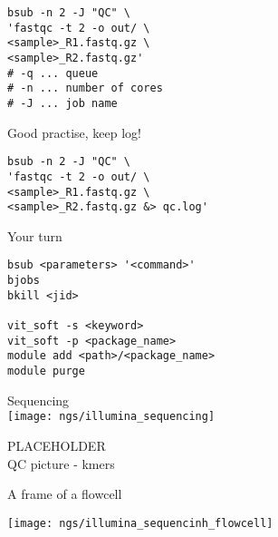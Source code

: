 \documentclass[xcolor=dvipsnames]{beamer}
\begin{document}
\begin{frame}[fragile]
\LARGE
\begin{verbatim}
bsub -n 2 -J "QC" \
'fastqc -t 2 -o out/ \
<sample>_R1.fastq.gz \
<sample>_R2.fastq.gz'
# -q ... queue
# -n ... number of cores
# -J ... job name
\end{verbatim}
\end{frame}

\begin{frame}[fragile]
Good practise, keep log!
\LARGE
\begin{verbatim}
bsub -n 2 -J "QC" \
'fastqc -t 2 -o out/ \
<sample>_R1.fastq.gz \
<sample>_R2.fastq.gz &> qc.log'
\end{verbatim}
\end{frame}

\begin{frame}[fragile]
	\begin{center}
		\Huge
		Your turn
	\end{center}
\begin{verbatim}
bsub <parameters> '<command>'
bjobs
bkill <jid>

vit_soft -s <keyword>
vit_soft -p <package_name>
module add <path>/<package_name>
module purge
\end{verbatim}
\end{frame}

\begin{frame}
	\begin{center}
		\Huge
		Sequencing\\
		\vspace{1cm}
		\texttt{[image: ngs/illumina\_sequencing]}
	\end{center}
\end{frame}

\begin{frame}
	PLACEHOLDER \\
	QC picture - kmers
\end{frame}

\begin{frame}
	\Huge
	A frame of a flowcell \\
	\begin{center}
		\texttt{[image: ngs/illumina\_sequencinh\_flowcell]}
	\end{center}
\end{frame}
\end{document}
